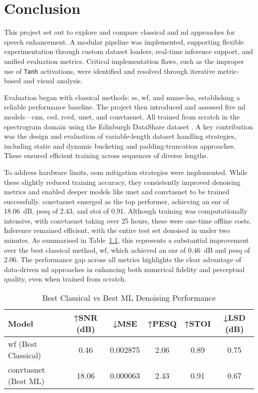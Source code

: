 \chapter{Conclusion}
\label{chp:conclusion}

This project set out to explore and compare classical and \gls{ml} approaches for speech enhancement. A modular pipeline was implemented, supporting flexible experimentation through custom dataset loaders, real-time inference support, and unified evaluation metrics. Critical implementation flaws, such as the improper use of \texttt{Tanh} activations, were identified and resolved through iterative metric-based and visual analysis.

Evaluation began with classical methods: \gls{ss}, \gls{wf}, and \gls{mmse-lsa}, establishing a reliable performance baseline. The project then introduced and assessed five \gls{ml} models—\gls{cnn}, \gls{ced}, \gls{rced}, \gls{unet}, and \gls{convtasnet}. All trained from scratch in the spectrogram domain using the Edinburgh DataShare dataset \cite{edinburghdataset}. A key contribution was the design and evaluation of variable-length dataset handling strategies, including static and dynamic bucketing and padding-truncation approaches. These ensured efficient training across sequences of diverse lengths.

To address hardware limits, \gls{oom} mitigation strategies were implemented. While these slightly reduced training accuracy, they consistently improved denoising metrics and enabled deeper models like \gls{unet} and \gls{convtasnet} to be trained successfully. \gls{convtasnet} emerged as the top performer, achieving an \gls{snr} of 18.06~dB, \gls{pesq} of 2.43, and \gls{stoi} of 0.91. Although training was computationally intensive, with \gls{convtasnet} taking over 25 hours, these were one-time offline costs. Inference remained efficient, with the entire test set denoised in under two minutes. As summarised in Table~\ref{tab:summary_comparison}, this represents a substantial improvement over the best classical method, \gls{wf}, which achieved an \gls{snr} of 0.46~dB and \gls{pesq} of 2.06. The performance gap across all metrics highlights the clear advantage of data-driven \gls{ml} approaches in enhancing both numerical fidelity and perceptual quality, even when trained from scratch.

\vspace{1em}
\begin{table}[H]
\centering
\caption{Best Classical vs Best ML Denoising Performance}
\label{tab:summary_comparison}
\begin{tabular}{|l|c|c|c|c|c|}
\hline
\textbf{Model} & \textbf{↑SNR (dB)} & \textbf{↓MSE} & \textbf{↑PESQ} & \textbf{↑STOI} & \textbf{↓LSD (dB)} \\
\hline
\gls{wf} (Best Classical) & 0.46 & 0.002875 & 2.06 & 0.89 & 0.75 \\
\gls{convtasnet} (Best ML) & 18.06 & 0.000063 & 2.43 & 0.91 & 0.67 \\
\hline
\end{tabular}
\end{table}
\vspace{1em}

